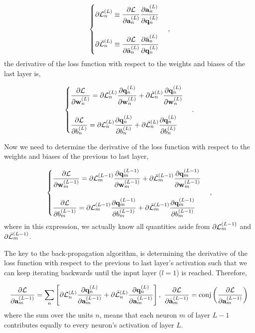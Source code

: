 \begin{equation}
	\begin{cases}
		\partial\mathcal{L}^{(L)}_{n} \equiv \dfrac{\partial \mathcal{L}}{\partial \mathbf{a}^{(L)}_{n}}\dfrac{\partial \mathbf{a}^{(L)}_{n}}{\partial \mathbf{q}^{(L)}_{n}} \\
		\\
		\partial\bar{\mathcal{L}}^{(L)}_{n} \equiv \dfrac{\partial \mathcal{L}}{\partial \bar{\mathbf{a}}^{(L)}_{n}}\dfrac{\partial \bar{\mathbf{a}}^{(L)}_{n}}{\partial \mathbf{q}^{(L)}_{n}} \\
	\end{cases},
\end{equation}
the derivative of the loss function with respect to the weights and biases of the last layer is,

\begin{equation}
	\begin{cases}
		\dfrac{\partial \mathcal{L}}{\partial \mathbf{w}^{(L)}_{n}} = \partial\mathcal{L}^{(L)}_{n}\dfrac{\partial \mathbf{q}^{(L)}_{n}}{\partial \mathbf{w}^{(L)}_{n}} + \partial\bar{\mathcal{L}}^{(L)}_{n}\dfrac{\partial \mathbf{q}^{(L)}_{n}}{\partial \mathbf{w}^{(L)}_{n}} \\
		\\
		\dfrac{\partial \mathcal{L}}{\partial b^{(L)}_{n}} = \partial\mathcal{L}^{(L)}_{n}\dfrac{\partial \mathbf{q}^{(L)}_{n}}{\partial b^{(L)}_{n}} + \partial\bar{\mathcal{L}}^{(L)}_{n}\dfrac{\partial \mathbf{q}^{(L)}_{n}}{\partial b^{(L)}_{n}} \\
	\end{cases}.
\end{equation}

Now we need to determine the derivative of the loss function with respect to the weights and biases of the previous to last layer,

\begin{equation}
	\begin{cases}
		\der{\loss}{\w{L-1}{m}} = \ploss{L-1}{m}\der{\pact{L-1}{m}}{\w{L-1}{m}} + \pcloss{L-1}{m}\der{\pact{L-1}{m}}{\w{L-1}{m}} \\
		\\
		\der{\loss}{\bi{L-1}{m}} = \ploss{L-1}{m}\der{\pact{L-1}{m}}{\bi{L-1}{m}} + \pcloss{L-1}{m}\der{\pact{L-1}{m}}{\bi{L-1}{m}} \\
	\end{cases},
	\label{eq:prev_layer_wb}
\end{equation}
where in this expression, we actually know all quantities aside from $ \partial\mathcal{L}^{(L-1)}_{m} $ and $ \partial\bar{\mathcal{L}}^{(L-1)}_{m} $.

The key to the back-propagation algorithm, is determining the derivative of the loss function with respect to the previous to last layer's activation such that we can keep iterating backwards until the input layer ($ l = 1 $) is reached. Therefore,

\begin{equation}
	\der{\loss}{\act{L-1}{m}} = \sum_{n} \left[ \ploss{L}{n}\der{\pact{L}{n}}{\act{L-1}{m}} + \pcloss{L}{n}\der{\pact{L}{n}}{\act{L-1}{m}} \right],
	\
	\der{\loss}{\cact{L-1}{m}} =  \text{conj}\group{\der{\loss}{\act{L-1}{m}}} \\
	\label{eq:back_prop}
\end{equation}
where the sum over the units $ n $, means that each neuron $ m $ of layer $ L-1 $ contributes equally to every neuron's activation of layer $ L $.


